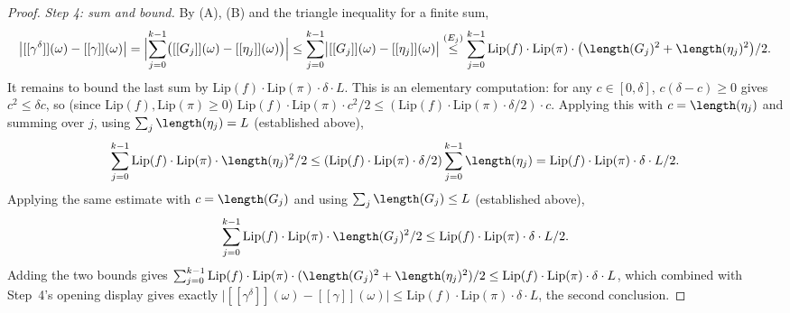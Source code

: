 \begin{proof}
  \emph{Step 4: sum and bound.} By (A), (B) and the triangle inequality for a finite sum,
  \[
    \bigl|[[\gamma^\delta]](\omega) - [[\gamma]](\omega)\bigr|
    = \Bigl|\sum_{j=0}^{k-1}\bigl([[G_j]](\omega)-[[\eta_j]](\omega)\bigr)\Bigr|
    \le \sum_{j=0}^{k-1} \bigl|[[G_j]](\omega)-[[\eta_j]](\omega)\bigr|
    \overset{(E_j)}{\le} \sum_{j=0}^{k-1} \mathrm{Lip}(f)\cdot\mathrm{Lip}(\pi)\cdot
      \bigl(\length(G_j)^2+\length(\eta_j)^2\bigr)/2
    .
  \]
  It remains to bound the last sum by $\mathrm{Lip}(f)\cdot\mathrm{Lip}(\pi)\cdot\delta\cdot L$. This
  is an elementary computation: for any $c \in [0,\delta]$, $c(\delta-c)\ge 0$ gives $c^2 \le \delta c$,
  so (since $\mathrm{Lip}(f),\mathrm{Lip}(\pi)\ge 0$)
  $\mathrm{Lip}(f)\cdot\mathrm{Lip}(\pi)\cdot c^2/2 \le (\mathrm{Lip}(f)\cdot\mathrm{Lip}(\pi)\cdot\delta/2)\cdot c$.
  Applying this with $c=\length(\eta_j)$ and summing over $j$, using
  $\sum_j \length(\eta_j) = L$ (established above),
  \[
    \sum_{j=0}^{k-1} \mathrm{Lip}(f)\cdot\mathrm{Lip}(\pi)\cdot\length(\eta_j)^2/2
      \le (\mathrm{Lip}(f)\cdot\mathrm{Lip}(\pi)\cdot\delta/2) \sum_{j=0}^{k-1}\length(\eta_j)
      = \mathrm{Lip}(f)\cdot\mathrm{Lip}(\pi)\cdot\delta\cdot L/2
    .
  \]
  Applying the same estimate with $c=\length(G_j)$ and using $\sum_j\length(G_j)\le L$ (established
  above),
  \[
    \sum_{j=0}^{k-1} \mathrm{Lip}(f)\cdot\mathrm{Lip}(\pi)\cdot\length(G_j)^2/2
      \le \mathrm{Lip}(f)\cdot\mathrm{Lip}(\pi)\cdot\delta\cdot L/2
    .
  \]
  Adding the two bounds gives
  $\sum_{j=0}^{k-1}\mathrm{Lip}(f)\cdot\mathrm{Lip}(\pi)\cdot(\length(G_j)^2+\length(\eta_j)^2)/2 \le
  \mathrm{Lip}(f)\cdot\mathrm{Lip}(\pi)\cdot\delta\cdot L$, which combined with Step~4's opening
  display gives exactly
  $\bigl|[[\gamma^\delta]](\omega)-[[\gamma]](\omega)\bigr| \le
  \mathrm{Lip}(f)\cdot\mathrm{Lip}(\pi)\cdot\delta\cdot L$, the second conclusion.
\end{proof}
